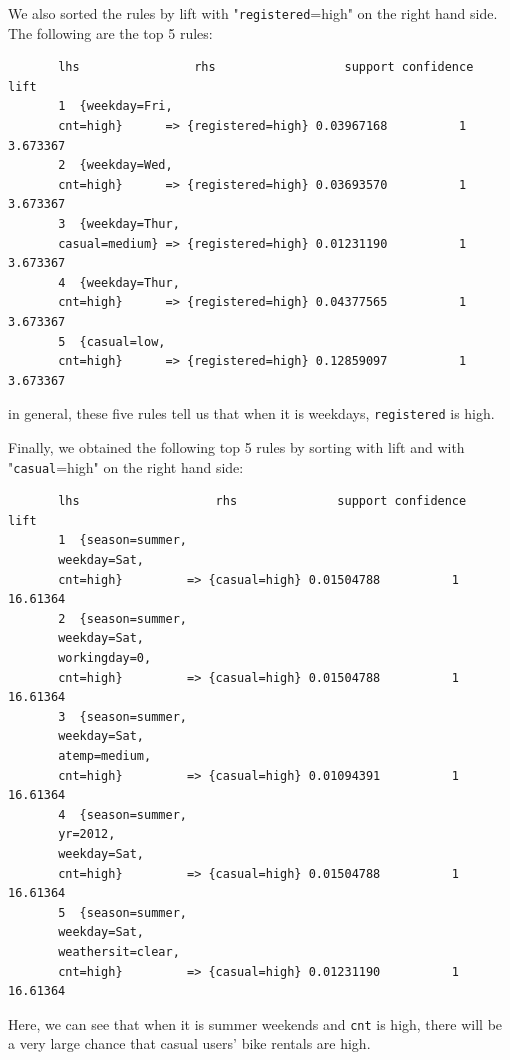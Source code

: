 \documentclass[12pt]{article}
\begin{document}
    We also sorted the rules by lift with "\texttt{registered}=high" on the right hand side. The following are the top 5 rules: \color{blue}
	\begin{verbatim}
	   lhs                rhs                  support confidence     lift
	   1  {weekday=Fri,                                                      
	   cnt=high}      => {registered=high} 0.03967168          1 3.673367
	   2  {weekday=Wed,                                                      
	   cnt=high}      => {registered=high} 0.03693570          1 3.673367
	   3  {weekday=Thur,                                                     
	   casual=medium} => {registered=high} 0.01231190          1 3.673367
	   4  {weekday=Thur,                                                     
	   cnt=high}      => {registered=high} 0.04377565          1 3.673367
	   5  {casual=low,                                                       
	   cnt=high}      => {registered=high} 0.12859097          1 3.673367
	\end{verbatim}\color{black}
	in general, these five rules tell us that when it is weekdays, \texttt{registered} is high.
	
	 Finally, we obtained the following top 5 rules by sorting with lift and with "\texttt{casual}=high" on the right hand side: \color{blue}
	\begin{verbatim}
	   lhs                   rhs              support confidence     lift
	   1  {season=summer,                                                   
	   weekday=Sat,                                                     
	   cnt=high}         => {casual=high} 0.01504788          1 16.61364
	   2  {season=summer,                                                   
	   weekday=Sat,                                                     
	   workingday=0,                                                    
	   cnt=high}         => {casual=high} 0.01504788          1 16.61364
	   3  {season=summer,                                                   
	   weekday=Sat,                                                     
	   atemp=medium,                                                    
	   cnt=high}         => {casual=high} 0.01094391          1 16.61364
	   4  {season=summer,                                                   
	   yr=2012,                                                         
	   weekday=Sat,                                                     
	   cnt=high}         => {casual=high} 0.01504788          1 16.61364
	   5  {season=summer,                                                   
	   weekday=Sat,                                                     
	   weathersit=clear,                                                
	   cnt=high}         => {casual=high} 0.01231190          1 16.61364
	\end{verbatim}\color{black}
	Here, we can see that when it is summer weekends and \texttt{cnt} is high, there will be a very large chance that casual users' bike rentals are high.  
	
\end{document}
